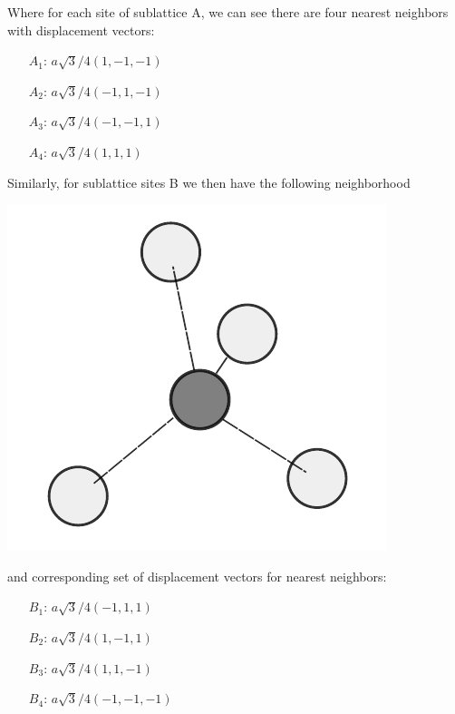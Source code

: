 \documentclass[10pt,a4paper]{article}
\begin{document}
\begin{multicols}{2}
\begin{center}
\end{center}
Where for each site of sublattice A, we can see there are four nearest neighbors with displacement vectors:
\begin{center}
\begin{minipage}[c]{0.6\linewidth}
\begin{itemize}
\item[$A_1$:] $a\sqrt{3}/4(1,-1,-1)$
\item[$A_2$:] $a\sqrt{3}/4(-1,1,-1)$
\item[$A_3$:] $a\sqrt{3}/4(-1,-1,1)$
\item[$A_4$:] $a\sqrt{3}/4(1,1,1)$
\end{itemize}
\end{minipage}
\end{center}
Similarly, for sublattice sites B we then have the following neighborhood 
\begin{center}
\includegraphics[scale=0.63]{diamond_b.pdf}
\end{center}
and corresponding set of displacement vectors for nearest neighbors:
\begin{center}
\begin{minipage}[c]{0.6\linewidth}
\begin{itemize}
\item[$B_1$:] $a\sqrt{3}/4(-1,1,1)$
\item[$B_2$:] $a\sqrt{3}/4(1,-1,1)$
\item[$B_3$:] $a\sqrt{3}/4(1,1,-1)$
\item[$B_4$:] $a\sqrt{3}/4(-1,-1,-1)$
\end{itemize}
\end{minipage}
\end{center}


\end{multicols}
\end{document}
